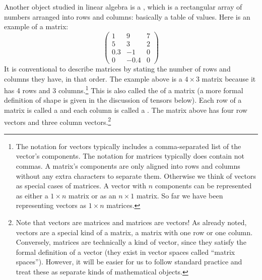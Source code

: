    Another object studied in linear algebra is a , which is a 
rectangular array of numbers arranged into rows and columns: basically a table of 
values. Here is an example of a matrix:
\[
\begin{pmatrix}
 1  &   9  & 7 \\
 5  &   3  & 2 \\
0.3 &  -1  & 0 \\
 0  & -0.4 & 0
\end{pmatrix}
\]
It is conventional to describe matrices by stating the number of rows and 
columns they have, in that order. The example above is a $4 \times 3$ 
matrix because it has 4 rows and 3 columns.\footnote{The notation for vectors typically includes a comma-separated list of the vector's components. The notation for matrices typically does contain not commas. A  matrix's components are only aligned into rows and columns without any extra characters to separate them. Otherwise we think of vectors as special cases of matrices. A vector with $n$ components can be represented as either a $1 \times n$ matrix or as an $n \times 1$ matrix. So far we have been representing vectors as $1 \times n$ matrices.} This is also called the  of a matrix (a more formal definition of shape is given in the discussion of tensors below). Each row of a matrix is called a  and each column is called a . The matrix above has four row vectors and 
three column vectors.\footnote{Note that vectors  are matrices and matrices are vectors!  As already noted, vectors are a special kind of a matrix, 
a matrix with one row or one column. Conversely, matrices are technically a 
kind of vector, since they satisfy the formal definition of a vector (they 
exist in vector spaces called ``matrix spaces''). However, it will be easier for us to follow standard practice and treat these as separate kinds of mathematical objects.}  

